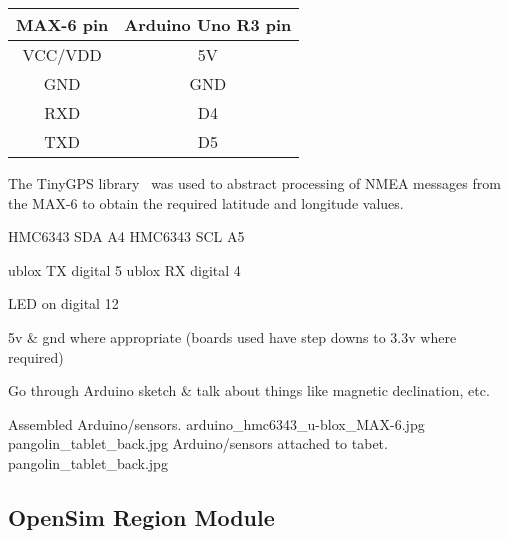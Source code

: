 \begin{tabular}{| c | c |}

\hline	

\textbf{MAX-6 pin} & \textbf{Arduino Uno R3 pin} \\

\hline

VCC/VDD & 5V \\ %

\hline

GND & GND \\

\hline

RXD & D4 \\

\hline

TXD & D5 \\

\hline

\end{tabular}








The TinyGPS library~\cite{Hart} was used to abstract processing of NMEA messages from the MAX-6 to obtain the required latitude and longitude values.

HMC6343 SDA A4
HMC6343 SCL A5

ublox TX digital 5
ublox RX digital 4

LED on digital 12

5v \& gnd where appropriate (boards used have step downs to 3.3v where required)

Go through Arduino sketch \& talk about things like magnetic declination, etc.



 {Assembled Arduino/sensors.} {arduino_hmc6343_u-blox_MAX-6.jpg}
       {pangolin_tablet_back.jpg} {Arduino/sensors attached to tabet.} {pangolin_tablet_back.jpg}


\subsection{OpenSim Region Module}

